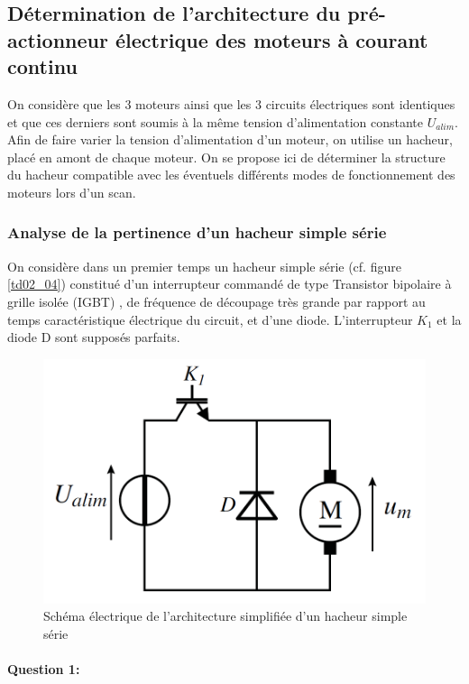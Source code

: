 \newpage

\subsection{Détermination de l'architecture du pré-actionneur électrique des moteurs à courant continu}

On considère que les 3 moteurs ainsi que les 3 circuits électriques sont identiques et que ces derniers sont
soumis à la même tension d'alimentation constante $U_{alim}$. Afin de faire varier la tension d'alimentation d'un moteur, on utilise un hacheur, placé en amont de chaque moteur. On se propose ici de déterminer la structure du hacheur compatible avec les éventuels différents modes de fonctionnement des moteurs lors d'un scan.

\subsubsection{Analyse de la pertinence d'un hacheur simple série}

On considère dans un premier temps un hacheur simple série (cf. figure \ref{td02_04}) constitué d'un interrupteur
commandé de type \og Transistor bipolaire à grille isolée (IGBT) \fg, de fréquence de découpage très grande par
rapport au temps caractéristique électrique du circuit, et d'une diode. L'interrupteur $K_1$ et la diode D sont supposés parfaits.

\begin{figure}[!h]
 \centering \includegraphics[width=0.8\linewidth]{img/td02_07}
 \caption{Schéma électrique de l'architecture simplifiée d'un hacheur simple série}
 \label{td02_07}
\end{figure}

\paragraph{Question 1:}

